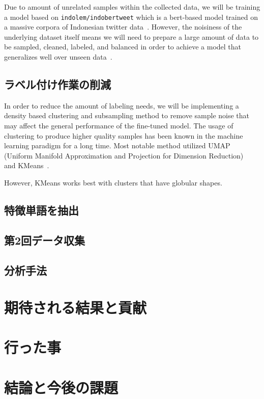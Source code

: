 \documentclass{jabstract}
\begin{document}
\begin{multicols}{2}
Due to amount of unrelated samples within the collected data, we will be training a model based on \texttt{indolem/indobertweet} which is a bert-based model trained on a massive corpora of Indonesian twitter data~\cite{koto2021indobertweet}. However, the noisiness of the underlying dataset itself means we will need to prepare a large amount of data to be sampled, cleaned, labeled, and balanced in order to achieve a model that generalizes well over unseen data~\cite{mazumder2023dataperf}. 

\subsection{ラベル付け作業の削減}
In order to reduce the amount of labeling needs, we will be implementing a density based clustering and subsampling method to remove sample noise that may affect the general performance of the fine-tuned model. The usage of clustering to produce higher quality samples has been known in the machine learning paradigm for a long time. Most notable method utilized UMAP (Uniform Manifold Approximation and Projection for Dimension Reduction)~\cite{mcinnes2018umap} and KMeans~\cite{macqueen1967some}.

However, KMeans works best with clusters that have globular shapes. 


\subsection{特徴単語を抽出}

\subsection{第2回データ収集}
\subsection{分析手法}
\section{期待される結果と貢献}
\section{行った事}
\section{結論と今後の課題}

{\small


}



\end{multicols}
\end{document}
